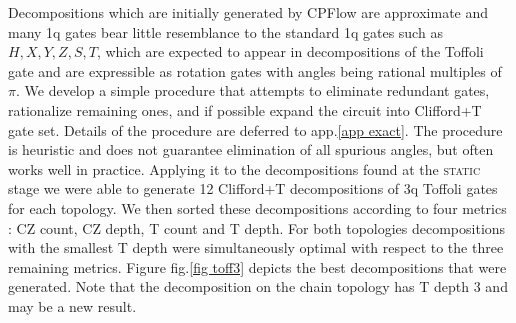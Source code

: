 \documentclass[twocolumn, amsfonts, amssymb, aps, nofootinbib]{revtex4-2}
\newcommand{\CZ}{CZ }
\newcommand{\T}{T }
\newcommand{\package}[1]{\textrm {#1 }}
\newcommand{\cpflow}{\package{CPFlow}}
\newcommand{\static}{\textsc{static }}
\begin{document}
Decompositions which are initially generated by \cpflow are approximate and many 1q gates bear little resemblance to the standard 1q gates such as $H, X, Y, Z, S, T$, which are expected to appear in decompositions of the Toffoli gate and are expressible as rotation gates with angles being rational multiples of $\pi$. We develop a simple procedure that attempts to eliminate redundant gates, rationalize remaining ones, and if possible expand the circuit into Clifford+T gate set. Details of the procedure are deferred to app.\ref{app exact}. The procedure is heuristic and does not guarantee elimination of all spurious angles, but often works well in practice. Applying it to the decompositions found at the \static stage we were able to generate 12 Clifford+T decompositions of 3q Toffoli gates for each topology. We then sorted these decompositions according to four metrics : \CZ count, \CZ depth, \T count and \T depth. For both topologies decompositions with the smallest \T  depth were simultaneously optimal with respect to the three remaining metrics. Figure fig.\ref{fig toff3} depicts  the best decompositions that were generated. Note that the decomposition on the chain topology has \T depth 3 and may be a new result.
\end{document}
